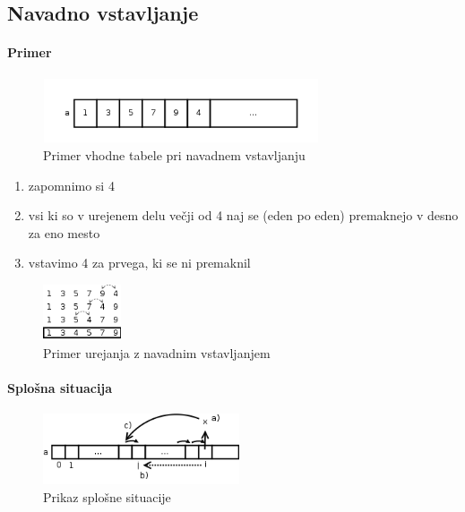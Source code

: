 \documentclass[a4paper,10pt]{article}
\begin{document}
\subsection{Navadno vstavljanje}

\paragraph{Primer}
\begin{flushleft}
\begin{figure}[hbt]
	\centering
	\includegraphics[width=8.15cm,height=1.9cm]{Slike/NavadnoVstavljanjeBinTabela.png}
\caption{Primer vhodne tabele pri navadnem vstavljanju}
\end{figure}

\end{flushleft}
\begin{enumerate}
\item zapomnimo si 4
\item vsi ki so v urejenem delu ve\v cji od 4 naj se (eden po eden) premaknejo v desno za eno mesto
\item vstavimo 4 za prvega, ki se ni premaknil
\end{enumerate}

\begin{figure}[h]
	\centering
	\includegraphics[width=2.3cm,height=1.65cm]{Slike/NavadnoVstavljanjeDemo.png}
	\caption{Primer urejanja z navadnim vstavljanjem}
	\label{Navadno vstavljanje}
\end{figure}


\paragraph{Splo\v sna situacija}
\begin{flushleft}
\begin{figure}[h]
	\centering
	\includegraphics[width=5.8cm,height=2.1cm]{Slike/SplosnaSituacija.png}
	\caption{Prikaz splo\v sne situacije}
\end{figure}
\end{flushleft}
\end{document}
